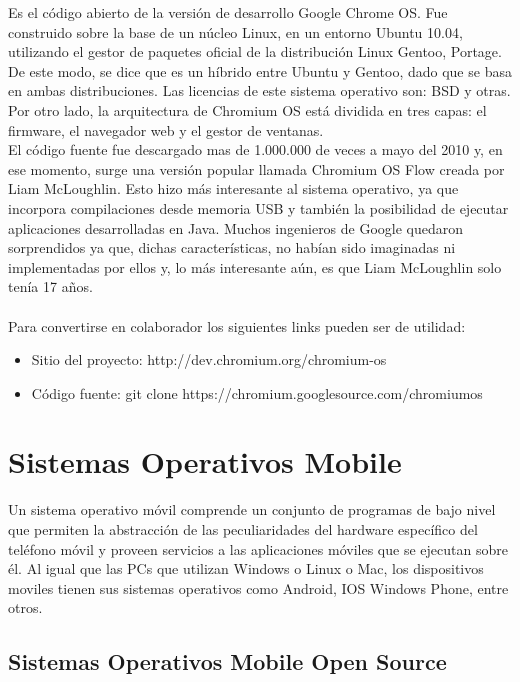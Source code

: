 Es el código abierto de la versión de desarrollo Google Chrome OS. Fue construido sobre la base de un núcleo Linux, en un entorno Ubuntu 10.04, utilizando el gestor de paquetes oficial de la distribución Linux Gentoo, Portage. De este modo, se dice que es un híbrido entre Ubuntu y Gentoo, dado que se basa en ambas distribuciones.
Las licencias de este sistema operativo son: BSD y otras.
Por otro lado, la arquitectura de Chromium OS está dividida en tres capas: el firmware, el navegador web y el gestor de ventanas.
\\
El código fuente fue descargado mas de 1.000.000 de veces a mayo del 2010 y, en ese momento, surge una versión popular llamada Chromium OS Flow creada por Liam McLoughlin. Esto hizo más interesante al sistema operativo, ya que incorpora compilaciones desde memoria USB y también la posibilidad de ejecutar aplicaciones desarrolladas en Java. Muchos ingenieros de Google quedaron sorprendidos ya que, dichas características, no habían sido imaginadas ni implementadas por ellos y, lo más interesante aún, es que Liam McLoughlin solo tenía 17 años.
\\
\\
Para convertirse en colaborador los siguientes links pueden ser de utilidad:
\begin{itemize}
     \item Sitio del proyecto: http://dev.chromium.org/chromium-os
     \item C\'odigo fuente: git clone https://chromium.googlesource.com/chromiumos
\end{itemize}

\section{Sistemas Operativos Mobile}
Un sistema operativo móvil comprende un conjunto de programas de bajo nivel que permiten la abstracción de las peculiaridades del hardware específico del teléfono móvil y proveen servicios a las aplicaciones móviles que se ejecutan sobre él. Al igual que las PCs que utilizan Windows o Linux o Mac, los dispositivos moviles tienen sus sistemas operativos como Android, IOS Windows Phone, entre otros.

\subsection{Sistemas Operativos Mobile Open Source}


